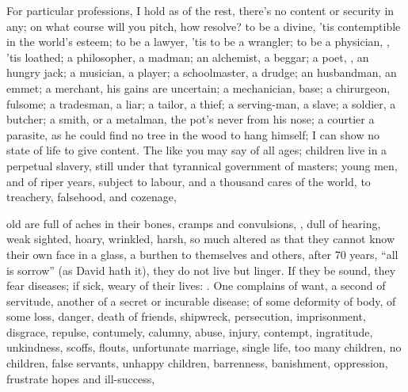 For particular professions, I hold as of the rest, there's no content or
security in any; on what course will you pitch, how resolve? to be a divine,
'tis contemptible in the world's esteem; to be a lawyer, 'tis to be a wrangler;
to be a physician, , 'tis loathed; a
philosopher, a madman; an alchemist, a beggar; a poet, , an hungry
jack; a musician, a player; a schoolmaster, a drudge; an husbandman, an emmet;
a merchant, his gains are uncertain; a mechanician, base; a chirurgeon,
fulsome; a tradesman, a liar; a tailor, a thief; a
serving-man, a slave; a soldier, a butcher; a smith, or a metalman, the pot's
never from his nose; a courtier a parasite, as he could find no tree in the
wood to hang himself; I can show no state of life to give content. The like you
may say of all ages; children live in a perpetual slavery, still under that
tyrannical government of masters; young men, and of riper years, subject to
labour, and a thousand cares of the world, to treachery, falsehood, and
cozenage,


old are full of aches in their bones, cramps and
convulsions, , dull of hearing, weak sighted, hoary, wrinkled,
harsh, so much altered as that they cannot know their own face in a glass, a
burthen to themselves and others, after 70 years, \enquote{all is sorrow} (as David
hath it), they do not live but linger. If they be sound, they fear diseases; if
sick, weary of their lives: . One complains
of want, a second of servitude, another of a secret or
incurable disease; of some deformity of body, of some loss, danger, death of
friends, shipwreck, persecution, imprisonment, disgrace, repulse,
contumely, calumny, abuse, injury, contempt, ingratitude,
unkindness, scoffs, flouts, unfortunate marriage, single life, too many
children, no children, false servants, unhappy children, barrenness,
banishment, oppression, frustrate hopes and ill-success, \etc{}

